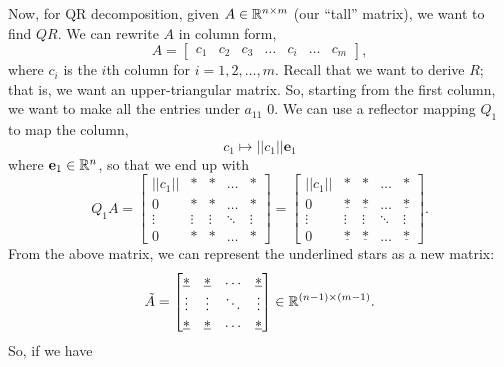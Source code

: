 \documentclass[letterpaper]{article}
\newcommand{\0}{\mathbf{0}}
\newcommand{\e}{\mathbf{e}}
\begin{document}
Now, for QR decomposition, given $A \in \mathbb{R}^{n \times m}$ (our ``tall'' matrix), we want to find $QR$. We can rewrite $A$ in column form,
\[A = \begin{bmatrix}
    c_1 & c_2 & c_3 & \hdots & c_i & \hdots & c_m
\end{bmatrix},\] 
where $c_i$ is the $i$th column for $i = 1, 2, \hdots, m$. Recall that we want to derive $R$; that is, we want an upper-triangular matrix. So, starting from the first column, we want to make all the entries under $a_{11}$ 0. We can use a reflector mapping $Q_1$ to map the column,
\[c_1 \mapsto ||c_1|| \e_1\]
where $\e_1 \in \R^n$, so that we end up with
\[Q_1 A = \begin{bmatrix}
    ||c_1|| & * & * & \hdots & * \\ 
    0 & * & * & \hdots & * \\ 
    \vdots & \vdots & \vdots & \ddots & \vdots \\ 
    0 & * & * & \hdots & *
\end{bmatrix} = \begin{bmatrix}
    ||c_1|| & * & * & \hdots & * \\ 
    0 & \underline{*} & \underline{*} & \hdots & \underline{*} \\ 
    \vdots & \vdots & \vdots & \ddots & \vdots \\ 
    0 & \underline{*} & \underline{*} & \hdots & \underline{*}
\end{bmatrix}.\]
From the above matrix, we can represent the underlined stars as a new matrix: \[\tilde{A} = \begin{bmatrix}
    \underline{*} & \underline{*} & \hdots & \underline{*} \\ 
    \vdots & \vdots & \ddots & \vdots \\ 
    \underline{*} & \underline{*} & \hdots & \underline{*}
\end{bmatrix} \in \mathbb{R}^{(n - 1) \times (m - 1)}.\]
So, if we have 
\end{document}
